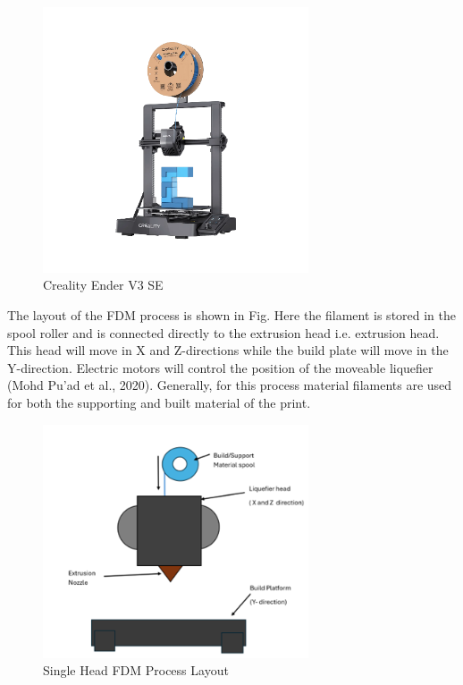 \begin{figure}[htbp]
    \centering
    \includegraphics[width=0.7\textwidth]{figures/CAD-3DPrint/NassPrinter.png}
    \caption{Creality Ender V3 SE}
    \label{fig:NassPrint}
\end{figure}

The layout of the FDM process is shown in Fig. Here the filament is stored in the spool roller and is connected directly to the extrusion head i.e. extrusion head. 
This head will move in X and Z-directions while the build plate will move in the Y-direction. 
Electric motors will control the position of the moveable liquefier (Mohd Pu'ad et al., 2020). 
Generally, for this process material filaments are used for both the supporting and built material of the print.

\begin{figure}[htbp]
    \centering
    \includegraphics[width=0.7\textwidth]{figures/CAD-3DPrint/FDMProcess.png}
    \caption{Single Head FDM Process Layout}
    \label{fig:FDMProcess}
    
\end{figure}

